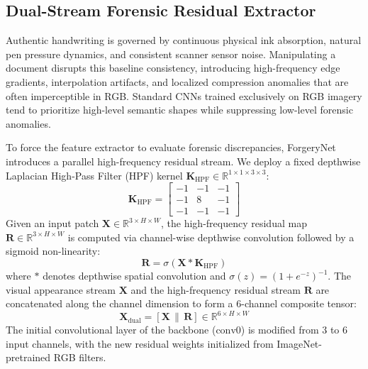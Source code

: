 \documentclass[runningheads]{llncs}
\begin{document}
\subsection{Dual-Stream Forensic Residual Extractor}\label{subsec4_1}
Authentic handwriting is governed by continuous physical ink absorption, natural pen pressure dynamics, and consistent scanner sensor noise. Manipulating a document disrupts this baseline consistency, introducing high-frequency edge gradients, interpolation artifacts, and localized compression anomalies that are often imperceptible in RGB. Standard CNNs trained exclusively on RGB imagery tend to prioritize high-level semantic shapes while suppressing low-level forensic anomalies.

To force the feature extractor to evaluate forensic discrepancies, ForgeryNet introduces a parallel high-frequency residual stream. We deploy a fixed depthwise Laplacian High-Pass Filter (HPF) kernel $\mathbf{K}_{\text{HPF}} \in \mathbb{R}^{1 \times 1 \times 3 \times 3}$:
\begin{equation}
\mathbf{K}_{\text{HPF}} = \begin{bmatrix} -1 & -1 & -1 \\ -1 & 8 & -1 \\ -1 & -1 & -1 \end{bmatrix}\label{eq_hpf}
\end{equation}
Given an input patch $\mathbf{X} \in \mathbb{R}^{3 \times H \times W}$, the high-frequency residual map $\mathbf{R} \in \mathbb{R}^{3 \times H \times W}$ is computed via channel-wise depthwise convolution followed by a sigmoid non-linearity:
\begin{equation}
\mathbf{R} = \sigma\left(\mathbf{X} * \mathbf{K}_{\text{HPF}}\right)\label{eq_residual}
\end{equation}
where $*$ denotes depthwise spatial convolution and $\sigma(z) = (1 + e^{-z})^{-1}$. The visual appearance stream $\mathbf{X}$ and the high-frequency residual stream $\mathbf{R}$ are concatenated along the channel dimension to form a 6-channel composite tensor:
\begin{equation}
\mathbf{X}_{\text{dual}} = [\mathbf{X} \,\|\, \mathbf{R}] \in \mathbb{R}^{6 \times H \times W}\label{eq_concat}
\end{equation}
The initial convolutional layer of the backbone ($\text{conv0}$) is modified from 3 to 6 input channels, with the new residual weights initialized from ImageNet-pretrained RGB filters.
\end{document}

